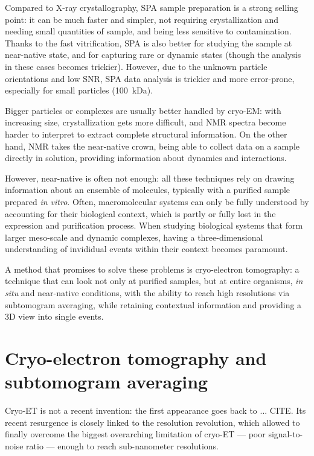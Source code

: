 Compared to X-ray crystallography, SPA sample preparation is a strong selling point: it can be much faster and simpler, not requiring crystallization and needing small quantities of sample, and being less sensitive to contamination.
Thanks to the fast vitrification, SPA is also better for studying the sample at near-native state, and for capturing rare or dynamic states (though the analysis in these cases becomes trickier).
However, due to the unknown particle orientations and low SNR, SPA data analysis is trickier and more error-prone, especially for small particles (\lesssim\qty{100}{\kilo\dalton}).

Bigger particles or complexes are usually better handled by cryo-EM: with increasing size, crystallization gets more difficult, and NMR spectra become harder to interpret to extract complete structural information.
On the other hand, NMR takes the near-native crown, being able to collect data on a sample directly in solution, providing information about dynamics and interactions.

However, near-native is often not enough: all these techniques rely on drawing information about an ensemble of molecules, typically with a purified sample prepared \textit{in vitro}.
Often, macromolecular systems can only be fully understood by accounting for their biological context, which is partly or fully lost in the expression and purification process.
When studying biological systems that form larger meso-scale and dynamic complexes, having a three-dimensional understanding of invididual events within their context becomes paramount.

A method that promises to solve these problems is cryo-electron tomography: a technique that can look not only at purified samples, but at entire organisms, \textit{in situ} and near-native conditions, with the ability to reach high resolutions via subtomogram averaging, while retaining contextual information and providing a 3D view into single events.


\section[Cryo-ET and STA]{Cryo-electron tomography and subtomogram averaging}

Cryo-ET is not a recent invention: the first appearance goes back to ... CITE.
Its recent resurgence is closely linked to the resolution revolution, which allowed to finally overcome the biggest overarching limitation of cryo-ET --- poor signal-to-noise ratio --- enough to reach sub-nanometer resolutions.

